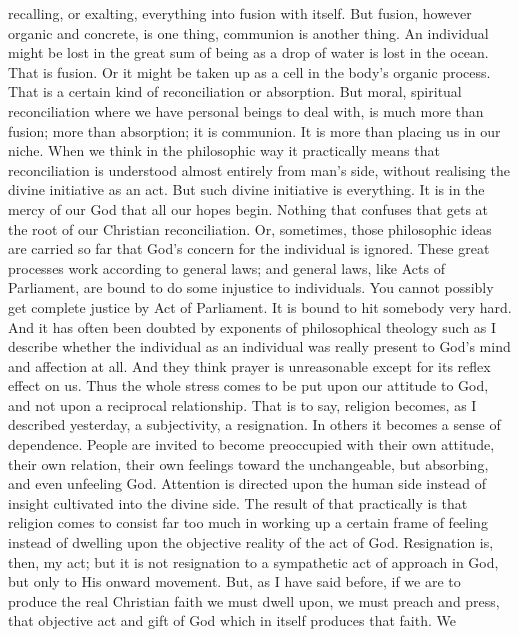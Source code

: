 \documentclass[draft]{ptfdoc}
\begin{document}
recalling, or exalting, everything into fusion 
with itself. But fusion, however organic and 
concrete, is one thing, communion is another 
thing. An individual might be lost in the great 
sum of being as a drop of water is lost in the 
ocean. That is fusion. Or it might be taken 
up as a cell in the body's organic process. 
That is a certain kind of reconciliation or 
absorption. But moral, spiritual reconciliation  
where we have personal beings to deal with, 
is much more than fusion; more than absorption; 
it is communion. It is more than placing 
us in our niche. When we think in the philosophic 
way it practically means that reconciliation 
is understood almost entirely from man's 
side, without realising the divine initiative as an 
act. But such divine initiative is everything. 
It is in the mercy of our God that all our hopes 
begin. Nothing that confuses that gets at the 
root of our Christian reconciliation. Or, sometimes,
those philosophic ideas are carried so far 
that God's concern for the individual is ignored. 
These great processes work according to general 
laws; and general laws, like Acts of Parliament, 
are bound to do some injustice to individuals. 
You cannot possibly get complete justice by Act 
of Parliament. It is bound to hit somebody 
very hard. And it has often been doubted by 
exponents of philosophical theology such as I 
describe whether the individual as an individual 
was really present to God's mind and affection 
at all. And they think prayer is unreasonable 
except for its reflex effect on us. Thus the 
whole stress comes to be put upon our attitude 
to God, and not upon a reciprocal relationship. 
That is to say, religion becomes, as I described 
yesterday, a subjectivity, a resignation. In 
others it becomes a sense of dependence. People 
are invited to become preoccupied with their 
own attitude, their own relation, their own 
feelings toward the unchangeable, but absorbing, 
and even unfeeling God. Attention is 
directed upon the human side instead of insight 
cultivated into the divine side. The result of 
that practically is that religion comes to consist 
far too much in working up a certain frame of 
feeling instead of dwelling upon the objective 
reality of the act of God. Resignation is, 
then, my act; but it is not resignation to 
a sympathetic act of approach in God, but 
only to His onward movement. But, as I 
have said before, if we are to produce the real 
Christian faith we must dwell upon, we must 
preach and press, that objective act and gift of 
God which in itself produces that faith. We 
\end{document}

